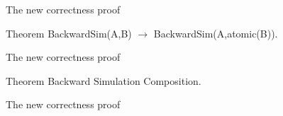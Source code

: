 \begin{frame}{The new correctness proof}
  \proofmixedbwd
  \vfill
  \begin{block}{Theorem}
    BackwardSim(A,B) $\rightarrow$ BackwardSim(A,atomic(B)).
  \end{block}
\end{frame}

\begin{frame}{The new correctness proof}
  \proofatbwd
  \vfill
  \begin{block}{Theorem}
    Backward Simulation Composition.
  \end{block}
\end{frame}

\begin{frame}{The new correctness proof}
  \prooffinal
\end{frame}

